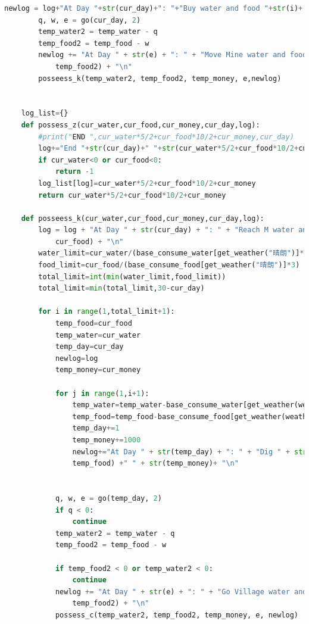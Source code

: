 \documentclass[withoutpreface,bwprint]{cumcmthesis} %
\begin{document}
\begin{appendices}
\begin{lstlisting}[language=python]
        newlog = log+"At Day "+str(cur_day)+": "+"Buy water and food "+str(i)+ "\n"
        q, w, e = go(cur_day, 2)
        temp_water2 = temp_water - q
        temp_food2 = temp_food - w
        newlog += "At Day " + str(e) + ": " + "Move Mine water and food " + str(temp_water2) + " " + str(
            temp_food2) + "\n"
        posseess_k(temp_water2, temp_food2, temp_money, e,newlog)
    
    
    log_list={}
    def possess_z(cur_water,cur_food,cur_money,cur_day,log):
        #print("END ",cur_water*5/2+cur_food*10/2+cur_money,cur_day)
        log+="End "+str(cur_day)+" "+str(cur_water*5/2+cur_food*10/2+cur_money)
        if cur_water<0 or cur_food<0:
            return -1
        log_list[log]=cur_water*5/2+cur_food*10/2+cur_money
        return cur_water*5/2+cur_food*10/2+cur_money
    
    def posseess_k(cur_water,cur_food,cur_money,cur_day,log):
        log = log + "At Day " + str(cur_day) + ": " + "Reach M water and food " + str(cur_water) + " " + str(
            cur_food) + "\n"
        water_limit=cur_water/(base_consume_water[get_weather("晴朗")]*3)
        food_limit=cur_food/(base_consume_food[get_weather("晴朗")]*3)
        total_limit=int(min(water_limit,food_limit))
        total_limit=min(total_limit,30-cur_day)
    
        for i in range(1,total_limit+1):
            temp_food=cur_food
            temp_water=cur_water
            temp_day=cur_day
            newlog=log
            temp_money=cur_money
    
            for j in range(1,i+1):
                temp_water=temp_water-base_consume_water[get_weather(weather[cur_day+j-2])]*3
                temp_food=temp_food-base_consume_food[get_weather(weather[cur_day+j-2])]*3
                temp_day+=1
                temp_money+=1000
                newlog+="At Day " + str(temp_day) + ": " + "Dig " + str(j)+" Days "+str(temp_water) + " " + str(
                temp_food) +" " + str(temp_money)+ "\n"
    
    
            q, w, e = go(temp_day, 2)
            if q < 0:
                continue
            temp_water2 = temp_water - q
            temp_food2 = temp_food - w
    
            if temp_food2 < 0 or temp_water2 < 0:
                continue
            newlog += "At Day " + str(e) + ": " + "Go Village water and food " + str(temp_water2) + " " + str(
                temp_food2) + "\n"
            possess_c(temp_water2, temp_food2, temp_money, e, newlog)
    

\end{lstlisting}
\end{appendices}
\end{document}
